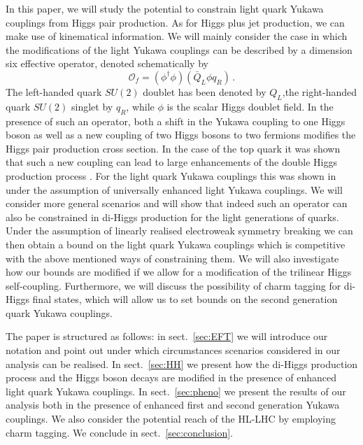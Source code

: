 \par
In this paper, we will study the potential to constrain light quark Yukawa couplings from Higgs pair production. As for Higgs plus jet production, we can make use of kinematical information. We will mainly consider the case in which the modifications of the light Yukawa couplings can be described by a dimension six effective operator, denoted schematically by
\begin{equation}
	\mathcal{O}_f=(\phi^{\dagger}\phi) (\bar{Q}_L \phi q_R)\,. \label{eq:effop}
\end{equation}
The left-handed quark $SU(2)$ doublet has been denoted by $Q_L$,the right-handed quark $SU(2)$ singlet by $q_R$, while $\phi$ is the scalar Higgs doublet field. In the presence of such an operator, both a shift in the Yukawa coupling to one Higgs boson as well as a new coupling of two Higgs bosons to two fermions modifies the Higgs pair production cross section. In the case of the top quark it was shown that such a new coupling can lead to large enhancements of the double Higgs production process \cite{Dib:2005re, Grober:2010yv, Contino:2012xk, Grober:2016wmf}. For the light quark Yukawa couplings this was shown in \cite{Bar-Shalom:2018rjs} under the assumption of universally enhanced light Yukawa couplings.
We will consider more general scenarios and will show that indeed such an operator can also be constrained in di-Higgs production for the light generations of quarks. Under the assumption of linearly realised electroweak symmetry breaking we can then obtain a bound on the light quark Yukawa couplings which is competitive with the above mentioned ways of constraining them. We will also investigate how our bounds are modified if we allow for a modification of the trilinear Higgs self-coupling. Furthermore, we will discuss the possibility of charm tagging for di-Higgs final states, which will allow us to set bounds on the second generation quark Yukawa couplings.
\par
The paper is structured as follows: in sect.~\ref{sec:EFT} we will introduce our notation and point out under which circumstances scenarios considered in our analysis can be realised. In sect.~\ref{sec:HH} we present how the di-Higgs production process and the Higgs boson decays are modified in the presence of enhanced light quark Yukawa couplings. In sect.~\ref{sec:pheno} we present the results of our analysis both in the presence of enhanced first and second generation Yukawa couplings. We also consider the potential reach of the HL-LHC by employing charm tagging.  We conclude in sect.~\ref{sec:conclusion}.
